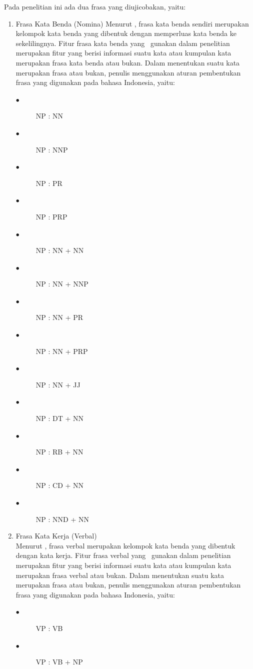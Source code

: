 \begin{enumerate}
	Pada penelitian ini ada dua frasa yang diujicobakan, yaitu:
	\begin{enumerate}
		\item Frasa Kata Benda (Nomina)
		Menurut \cite{hs2005bahasa}, frasa kata benda sendiri merupakan kelompok kata benda yang dibentuk dengan memperluas kata benda ke sekelilingnya. Fitur frasa kata benda yang \saya~gunakan dalam penelitian merupakan fitur yang berisi informasi suatu kata atau kumpulan kata merupakan frasa kata benda atau bukan. Dalam menentukan suatu kata merupakan frasa atau bukan, penulis menggunakan aturan pembentukan frasa yang digunakan pada bahasa Indonesia, yaitu:
		\begin{description}
			\item[$\bullet$] NP : NN
			\item[$\bullet$] NP : NNP
			\item[$\bullet$] NP : PR
			\item[$\bullet$] NP : PRP
			\item[$\bullet$] NP : NN + NN
			\item[$\bullet$] NP : NN + NNP
			\item[$\bullet$] NP : NN + PR
			\item[$\bullet$] NP : NN + PRP
			\item[$\bullet$] NP : NN + JJ
			\item[$\bullet$] NP : DT + NN
			\item[$\bullet$] NP : RB + NN
			\item[$\bullet$] NP : CD + NN
			\item[$\bullet$] NP : NND + NN
		\end{description}
		
		\item Frasa Kata Kerja (Verbal)\\
		Menurut \cite{hs2005bahasa}, frasa verbal merupakan kelompok kata benda yang dibentuk dengan kata kerja. Fitur frasa verbal yang \saya~gunakan dalam penelitian merupakan fitur yang berisi informasi suatu kata atau kumpulan kata merupakan frasa verbal atau bukan. Dalam menentukan suatu kata merupakan frasa atau bukan, penulis menggunakan aturan pembentukan frasa yang digunakan pada bahasa Indonesia, yaitu:
		\begin{description}
			\item[$\bullet$] VP : VB
			\item[$\bullet$] VP : VB + NP
		\end{description}
	\end{enumerate}


\end{enumerate}
